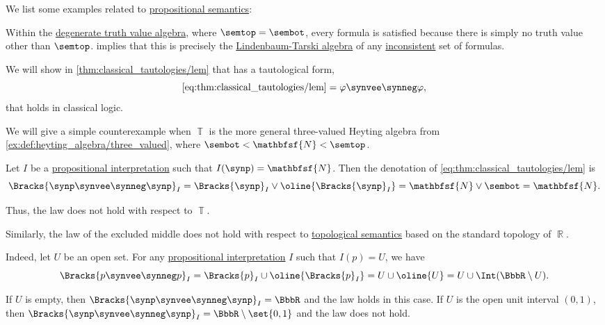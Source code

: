 \begin{example}\label{ex:def:propositional_semantics}
  We list some examples related to \hyperref[def:propositional_semantics]{propositional semantics}:
  \begin{thmenum}
     Within the \hyperref[def:truth_value_algebra/degenerate]{degenerate truth value algebra}, where \( \semtop = \sembot \), every formula is satisfied because there is simply no truth value other than \( \semtop \).  implies that this is precisely the \hyperref[def:lindenbaum_tarski_algebra]{Lindenbaum-Tarski algebra} of any \hyperref[def:propositional_theory/consistent]{inconsistent} set of formulas.

     We will show in \cref{thm:classical_tautologies/lem} that  has a tautological form,
    \begin{equation*}
      \eqref{eq:thm:classical_tautologies/lem} = \varphi \synvee \synneg \varphi,
    \end{equation*}
    that holds in classical logic.

    We will give a simple counterexample when \( \BbbT \) is the more general three-valued Heyting algebra from \cref{ex:def:heyting_algebra/three_valued}, where \( \sembot < \mathbfsf{N} < \semtop \).

    Let \( I \) be a \hyperref[alg:propositional_denotation]{propositional interpretation} such that \( I(\synp) = \mathbfsf{N} \). Then the denotation of \eqref{eq:thm:classical_tautologies/lem} is
    \begin{equation*}
      \Bracks{\synp \synvee \synneg \synp}_I
      =
      \Bracks{\synp}_I \vee \oline{\Bracks{\synp}_I}
      =
      \mathbfsf{N} \vee \sembot
      =
      \mathbfsf{N}.
    \end{equation*}

    Thus, the law does not hold with respect to \( \BbbT \).

     Similarly, the law of the excluded middle does not hold with respect to \hyperref[def:truth_value_algebra/topological]{topological semantics} based on the standard topology of \( \BbbR \).

    Indeed, let \( U \) be an open set. For any \hyperref[alg:propositional_denotation]{propositional interpretation} \( I \) such that \( I(p) = U \), we have
    \begin{equation*}
      \Bracks{p \synvee \synneg p}_I
      =
      \Bracks{p}_I \cup \oline{\Bracks{p}_I}
      =
      U \cup \oline{U}
      =
      U \cup \Int(\BbbR \setminus U).
    \end{equation*}

    If \( U \) is empty, then \( \Bracks{\synp \synvee \synneg \synp}_I = \BbbR \) and the law holds in this case. If \( U \) is the open unit interval \( (0, 1) \), then \( \Bracks{\synp \synvee \synneg \synp}_I = \BbbR \setminus \set{ 0, 1 } \) and the law does not hold.
  \end{thmenum}
\end{example}

